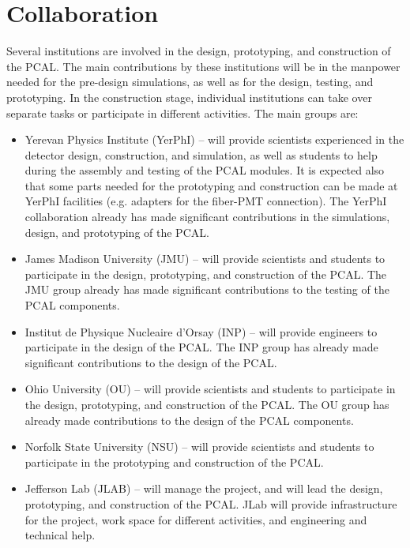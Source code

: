\section{Collaboration}

Several institutions are involved in the design, prototyping, and
construction of the PCAL.  The main contributions by these institutions
will be in the manpower needed for the pre-design simulations, as
well as for the design, testing, and prototyping.  In the construction 
stage, individual institutions can take over separate tasks or participate 
in different activities.  The main groups are: 

\begin{itemize}

\item Yerevan Physics Institute (YerPhI) -- will provide scientists
  experienced in the detector design, construction, and simulation, as 
  well as students to help during the assembly and testing of the PCAL
  modules.  It is expected also that some parts needed for the
  prototyping and construction can be made at YerPhI facilities
  (e.g. adapters for the fiber-PMT connection). The YerPhI collaboration
  already has made significant contributions in the simulations, design,
  and prototyping of the PCAL.

\item James Madison University (JMU) -- will provide scientists and
  students to participate in the design, prototyping, and construction
  of the PCAL. The JMU group already has made significant contributions 
  to the testing of the PCAL components.

\item Institut de Physique Nucleaire d'Orsay (INP) -- will provide
  engineers to participate in the design of the PCAL.  The INP group 
  has already made significant contributions to the design of the PCAL.

\item Ohio University (OU) -- will provide scientists and students to 
  participate in the design, prototyping, and construction of the PCAL. 
  The OU group has already made contributions to the design of the PCAL 
  components.

\item Norfolk State University (NSU) -- will provide scientists and
  students to participate in the prototyping and construction
  of the PCAL. 

\item Jefferson Lab (JLAB) -- will manage the project, and will lead the
  design, prototyping, and construction of the PCAL.  JLab will provide
  infrastructure for the project, work space for different activities,
  and engineering and technical help.

\end{itemize}